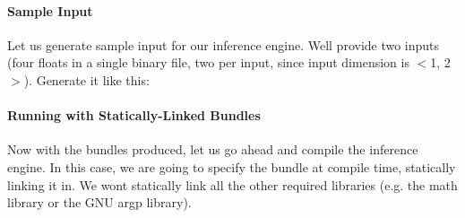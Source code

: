 \paragraph*{Sample Input}

Let us generate sample input for our inference engine. We\textquotesingle{}ll provide two inputs (four floats in a single binary file, two per input, since input dimension is {\ttfamily $<$1, 2$>$}). Generate it like this\+: 


\paragraph*{Running with Statically-\/\+Linked Bundles}

Now with the bundles produced, let us go ahead and compile the inference engine. In this case, we are going to specify the bundle at compile time, statically linking it in. We won\textquotesingle{}t statically link all the other required libraries (e.\+g. the math library or the G\+NU argp library).

